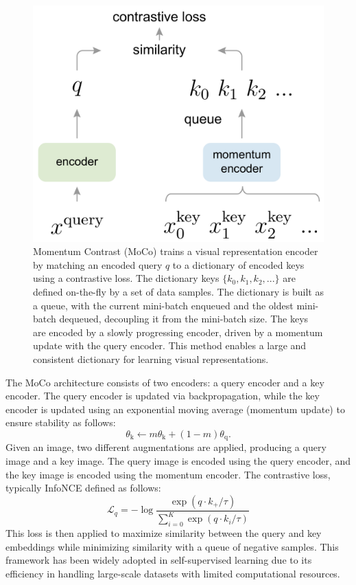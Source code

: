 \begin{figure}[t]\centering
\vspace{1.em}
\includegraphics[width=.65\linewidth]{images/MoCo_Architecture.png}
\caption{Momentum Contrast (MoCo) trains a visual representation encoder by matching an encoded query $q$ to a dictionary of encoded keys using a contrastive loss. The dictionary keys $\{k_0, k_1, k_2, ...\}$ are defined on-the-fly by a set of data samples.
The dictionary is built as a queue, with the current mini-batch enqueued and the oldest mini-batch dequeued, decoupling it from the mini-batch size.
The keys are encoded by a slowly progressing encoder, driven by a momentum update with the query encoder.
This method enables a large and consistent dictionary for learning visual representations.
\label{fig:teaser}}
\vspace{-1em}
\end{figure}

The MoCo architecture consists of two encoders: a query encoder and a key encoder. The query encoder is updated via backpropagation, while the key encoder is updated using an exponential moving average (momentum update) to ensure stability as follows:
\begin{equation}
\theta_\textrm{k} \leftarrow m \theta_\textrm{k} + (1 - m) \theta_\textrm{q}.
\label{eq:moco}
\end{equation}
Given an image, two different augmentations are applied, producing a query image and a key image. The query image is encoded using the query encoder, and the key image is encoded using the momentum encoder. The contrastive loss, typically InfoNCE defined as follows:
\begin{equation}
\mathcal{L}_q = -\log \frac{\exp(q{\cdot}k_+ / \tau)}{\sum_{i=0}^{K}\exp(q{\cdot}k_i  / \tau)}
\label{eq:infonce}
\end{equation}
This loss is then applied to maximize similarity between the query and key embeddings while minimizing similarity with a queue of negative samples. This framework has been widely adopted in self-supervised learning due to its efficiency in handling large-scale datasets with limited computational resources.

